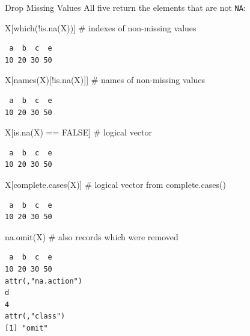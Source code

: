 \documentclass[
  ignorenonframetext,
  aspectratio=169,
]{beamer}
\newenvironment{Shaded}{\begin{snugshade}}{\end{snugshade}}
\newcommand{\CommentTok}[1]{\textcolor[rgb]{0.37,0.37,0.37}{#1}}
\newcommand{\ConstantTok}[1]{\textcolor[rgb]{0.56,0.35,0.01}{#1}}
\newcommand{\FunctionTok}[1]{\textcolor[rgb]{0.28,0.35,0.67}{#1}}
\newcommand{\NormalTok}[1]{\textcolor[rgb]{0.00,0.23,0.31}{#1}}
\newcommand{\SpecialCharTok}[1]{\textcolor[rgb]{0.37,0.37,0.37}{#1}}
\begin{document}
\begin{frame}[fragile]{Drop Missing Values}
\protect\hypertarget{drop-missing-values}{}
All five return the elements that are not \texttt{NA}:

\begin{Shaded}
\begin{Highlighting}[]
\NormalTok{X[}\FunctionTok{which}\NormalTok{(}\SpecialCharTok{!}\FunctionTok{is.na}\NormalTok{(X))]          }\CommentTok{\# indexes of non{-}missing values}
\end{Highlighting}
\end{Shaded}

\begin{verbatim}
 a  b  c  e 
10 20 30 50 
\end{verbatim}

\begin{Shaded}
\begin{Highlighting}[]
\NormalTok{X[}\FunctionTok{names}\NormalTok{(X)[}\SpecialCharTok{!}\FunctionTok{is.na}\NormalTok{(X)]]       }\CommentTok{\# names of non{-}missing values}
\end{Highlighting}
\end{Shaded}

\begin{verbatim}
 a  b  c  e 
10 20 30 50 
\end{verbatim}

\begin{Shaded}
\begin{Highlighting}[]
\NormalTok{X[}\FunctionTok{is.na}\NormalTok{(X) }\SpecialCharTok{==} \ConstantTok{FALSE}\NormalTok{]         }\CommentTok{\# logical vector}
\end{Highlighting}
\end{Shaded}

\begin{verbatim}
 a  b  c  e 
10 20 30 50 
\end{verbatim}

\begin{Shaded}
\begin{Highlighting}[]
\NormalTok{X[}\FunctionTok{complete.cases}\NormalTok{(X)]         }\CommentTok{\# logical vector from complete.cases()}
\end{Highlighting}
\end{Shaded}

\begin{verbatim}
 a  b  c  e 
10 20 30 50 
\end{verbatim}

\begin{Shaded}
\begin{Highlighting}[]
\FunctionTok{na.omit}\NormalTok{(X)                   }\CommentTok{\# also records which were removed}
\end{Highlighting}
\end{Shaded}

\begin{verbatim}
 a  b  c  e 
10 20 30 50 
attr(,"na.action")
d 
4 
attr(,"class")
[1] "omit"
\end{verbatim}
\end{frame}
\end{document}
